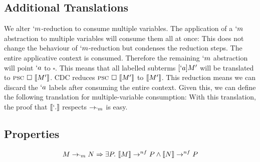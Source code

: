\subsection{Additional Translations}
We alter $`m$-reduction to consume multiple variables.
The application of a $`m$ abstraction to multiple variables will consume them all at once:
This does not change the behaviour of $`m$-reduction but condenses the reduction steps.
The entire applicative context is consumed.
Therefore the remaining $`m$ abstraction will point $`a$ to $\square$.
This means that all labelled subterms $[`a]M'$ will be translated to $\textsc{psc } \square\ \llbracket M' \rrbracket$.
CDC reduces $\textsc{psc } \square\ \llbracket M' \rrbracket$ to $\llbracket M' \rrbracket$.
This reduction means we can discard the $`a$ labels after consuming the entire context.
Given this, we can define the following translation for multiple-variable consumption:
With this translation, the proof that $\tr{`.}$ respects $\to_{`m}$ is easy.

\subsection{Properties}

\begin{theorem}[Soundness of $\tr{`.}$]
\[ M \to_{`m} N \Rightarrow \exists P.\ \tr{M} \to^{nf} P \land \tr{N} \to^{nf} P \]
\end{theorem}


